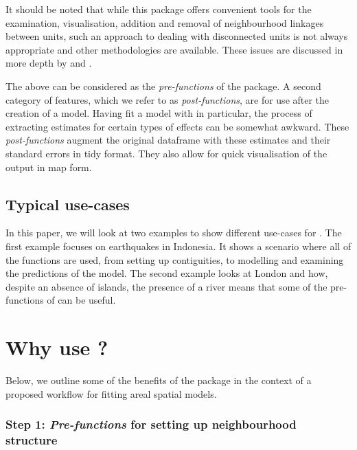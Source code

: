 It should be noted that while this package offers convenient tools for the examination, visualisation, addition and removal of neighbourhood linkages between units, such an approach to dealing with disconnected units is not always appropriate and other methodologies are available. These issues are discussed in more depth by \citet{bivandportnov} and \citet{freni}.

The above can be considered as the \emph{pre-functions} of the package. A
second category of features, which we refer to as \emph{post-functions},
are for use after the creation of a model. Having fit a model with  \citep{mgcv} in particular, the process of extracting estimates for certain types of effects can be somewhat awkward. These \emph{post-functions} augment the original dataframe with these estimates and their standard errors in tidy format. They also allow for quick visualisation of the output in map form.

\subsection{Typical use-cases}\label{typical-use-cases}

In this paper, we will look at two examples to show different use-cases for
. The first example focuses on earthquakes in
Indonesia. It shows a scenario where all of the functions are used, from
setting up contiguities, to modelling and examining the predictions of the
model. The second example looks at London and how, despite an absence of islands,
the presence of a river means that some of the pre-functions of
 can be useful.

\section{\texorpdfstring{Why use ?}{Why use ?}}\label{why-use}

Below, we outline some of the benefits of the package in the context of a proposed workflow for fitting areal spatial models.

\subsubsection{\texorpdfstring{Step 1: \emph{Pre-functions} for setting up neighbourhood structure}{Step 1: Pre-functions for setting up neighbourhood structure}}\label{step-1-pre-functions-for-setting-up-neighbourhood-structure}

